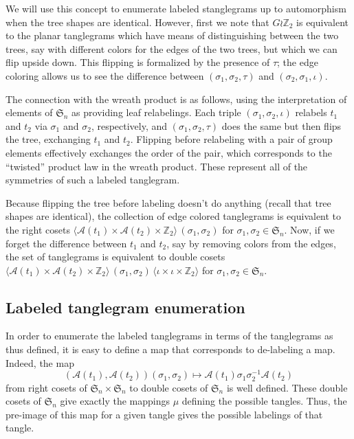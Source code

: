 \documentclass{amsart}
\newcommand{\ZZ}{\mathbb Z}
\newcommand{\fS}{\mathfrak S}
\newcommand{\aut}{\mathcal A}
\newcommand{\pairing}{\mu}
\newcommand{\id}{\iota}
\newcommand{\wrtwo}{\wr \ZZ_2}
\begin{document}
We will use this concept to enumerate labeled stanglegrams up to automorphism when the tree shapes are identical.
However, first we note that $G \wrtwo$ is equivalent to the planar tanglegrams which have means of distinguishing between the two trees, say with different colors for the edges of the two trees, but which we can flip upside down.
This flipping is formalized by the presence of $\tau$; the edge coloring allows us to see the difference between $(\sigma_1, \sigma_2, \tau)$ and $(\sigma_2, \sigma_1, \id)$.

The connection with the wreath product is as follows, using the interpretation of elements of $\fS_n$ as providing leaf relabelings.
Each triple $(\sigma_1, \sigma_2, \id)$ relabels $t_1$ and $t_2$ via $\sigma_1$ and $\sigma_2$, respectively, and $(\sigma_1, \sigma_2, \tau)$ does the same but then flips the tree, exchanging $t_1$ and $t_2$.
Flipping before relabeling with a pair of group elements effectively exchanges the order of the pair, which corresponds to the ``twisted'' product law in the wreath product.
These represent all of the symmetries of such a labeled tanglegram.

Because flipping the tree before labeling doesn't do anything (recall that tree shapes are identical), the collection of edge colored tanglegrams is equivalent to the right cosets $\langle \aut(t_1) \times \aut(t_2) \times \ZZ_2 \rangle \, (\sigma_1, \sigma_2)$ for $\sigma_1, \sigma_2 \in \fS_n$.
Now, if we forget the difference between $t_1$ and $t_2$, say by removing colors from the edges, the set of tanglegrams is equivalent to double cosets
$\langle \aut(t_1) \times \aut(t_2) \times \ZZ_2 \rangle \, (\sigma_1, \sigma_2) \, \langle {\id} \times {\id} \times \ZZ_2 \rangle$ for $\sigma_1, \sigma_2 \in \fS_n$.


\subsection{Labeled tanglegram enumeration}
In order to enumerate the labeled tanglegrams in terms of the tanglegrams as thus defined, it is easy to define a map that corresponds to de-labeling a map.
Indeed, the map
\[
(\aut(t_1), \aut(t_2)) (\sigma_1, \sigma_2) \mapsto \aut(t_1) \sigma_1 \sigma_2^{-1} \aut(t_2)
\]
from right cosets of $\fS_n \times \fS_n$ to double cosets of $\fS_n$ is well defined.
These double cosets of $\fS_n$ give exactly the mappings $\pairing$ defining the possible tangles.
Thus, the pre-image of this map for a given tangle gives the possible labelings of that tangle.
\end{document}
